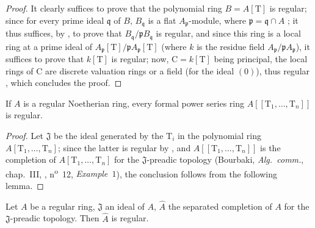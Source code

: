 \begin{proof}
It clearly suffices to prove that the polynomial ring $B=A[\mathrm{T}]$ is regular;
since for every prime ideal $\mathfrak{q}$ of $B$, $B_\mathfrak{q}$ is a flat $A_\mathfrak{p}$-module, where $\mathfrak{p}=\mathfrak{q}\cap A$ ;
  it thus suffices, by , to prove that $B_\mathfrak{q}/\mathfrak{p}B_\mathfrak{q}$ is regular, and since this ring is a local ring at a prime ideal of $A_\mathfrak{p}[\mathrm{T}]/\mathfrak{p}A_\mathfrak{p}[\mathrm{T}]$ (where $k$ is the residue field $A_\mathfrak{p}/\mathfrak{p}A_\mathfrak{p}$), it suffices to prove that $k[\mathrm{T}]$ is regular;
now, $\mathrm{C}=k[\mathrm{T}]$ being principal, the local rings of $\mathrm{C}$ are discrete valuation rings or a field (for the ideal $(0)$), thus regular , which concludes the proof.
\end{proof}

\begin{corollary}[17.3.8]
\label{0.17.3.8}
If $A$ is a regular Noetherian ring, every formal power series ring $A[[\mathrm{T}_1,\ldots,\mathrm{T}_n]]$ is regular.
\end{corollary}

\begin{proof}
Let $\mathfrak{J}$ be the ideal generated by the $\mathrm{T}_i$ in the polynomial ring $A[\mathrm{T}_1,\ldots,\mathrm{T}_n]$;
since the latter is regular by , and $A[[\mathrm{T}_1,\ldots,\mathrm{T}_n]]$ is the completion of $A[\mathrm{T}_1,\ldots,\mathrm{T}_n]$ for the $\mathfrak{J}$-preadic topology (Bourbaki, \emph{Alg.~comm.}, chap.~III, , n\textsuperscript{o}~12, \emph{Example~$1$}), the conclusion follows from the following lemma.
\end{proof}

\begin{lemma}[17.3.8.1]
\label{0.17.3.8.1}
Let $A$ be a regular ring, $\mathfrak{J}$ an ideal of $A$, $\widehat{A}$ the separated completion of $A$ for the $\mathfrak{J}$-preadic topology.
Then $\widehat{A}$ is regular.
\end{lemma}

